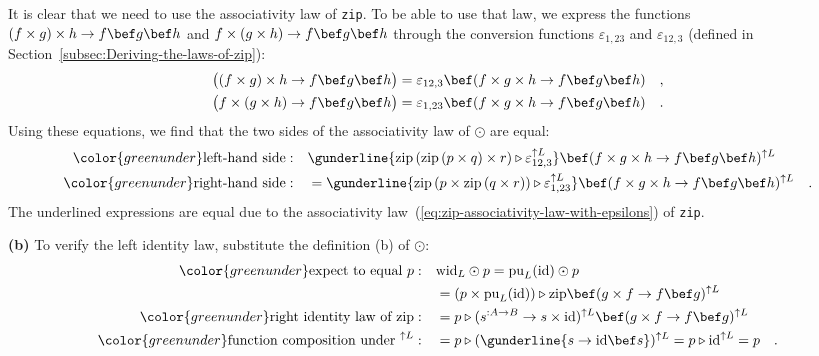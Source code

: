 It is clear that we need to use the associativity law of \lstinline!zip!.
To be able to use that law, we express the functions $(f\times g)\times h\rightarrow f\bef g\bef h$
and $f\times(g\times h)\rightarrow f\bef g\bef h$ through the conversion
functions $\varepsilon_{1,23}$ and $\varepsilon_{12,3}$ (defined
in Section~\ref{subsec:Deriving-the-laws-of-zip}):
\begin{align*}
 & \big((f\times g)\times h\rightarrow f\bef g\bef h\big)=\varepsilon_{12,3}\bef(f\times g\times h\rightarrow f\bef g\bef h)\quad,\\
 & \big(f\times(g\times h)\rightarrow f\bef g\bef h\big)=\varepsilon_{1,23}\bef(f\times g\times h\rightarrow f\bef g\bef h)\quad.
\end{align*}
Using these equations, we find that the two sides of the associativity
law of $\odot$ are equal:
\begin{align*}
{\color{greenunder}\text{left-hand side}:}\quad & \gunderline{\text{zip}\left(\text{zip}\left(p\times q\right)\times r\right)\triangleright\varepsilon_{12,3}^{\uparrow L}}\bef(f\times g\times h\rightarrow f\bef g\bef h)^{\uparrow L}\\
{\color{greenunder}\text{right-hand side}:}\quad & =\gunderline{\text{zip}\left(p\times\text{zip}\left(q\times r\right)\right)\triangleright\varepsilon_{1,23}^{\uparrow L}}\bef(f\times g\times h\rightarrow f\bef g\bef h)^{\uparrow L}\quad.
\end{align*}
The underlined expressions are equal due to the associativity law~(\ref{eq:zip-associativity-law-with-epsilons})
of \lstinline!zip!.

\textbf{(b)} To verify the left identity law, substitute the definition
(b) of $\odot$:
\begin{align*}
{\color{greenunder}\text{expect to equal }p:}\quad & \text{wid}_{L}\odot p=\text{pu}_{L}(\text{id})\odot p\\
 & =(p\times\text{pu}_{L}(\text{id}))\triangleright\text{zip}\bef(g\times f\rightarrow f\bef g)^{\uparrow L}\\
{\color{greenunder}\text{right identity law of }\text{zip}:}\quad & =p\triangleright(s^{:A\rightarrow B}\rightarrow s\times\text{id})^{\uparrow L}\bef(g\times f\rightarrow f\bef g)^{\uparrow L}\\
{\color{greenunder}\text{function composition under }^{\uparrow L}:}\quad & =p\triangleright(\gunderline{s\rightarrow\text{id}\bef s})^{\uparrow L}=p\triangleright\text{id}^{\uparrow L}=p\quad.
\end{align*}

